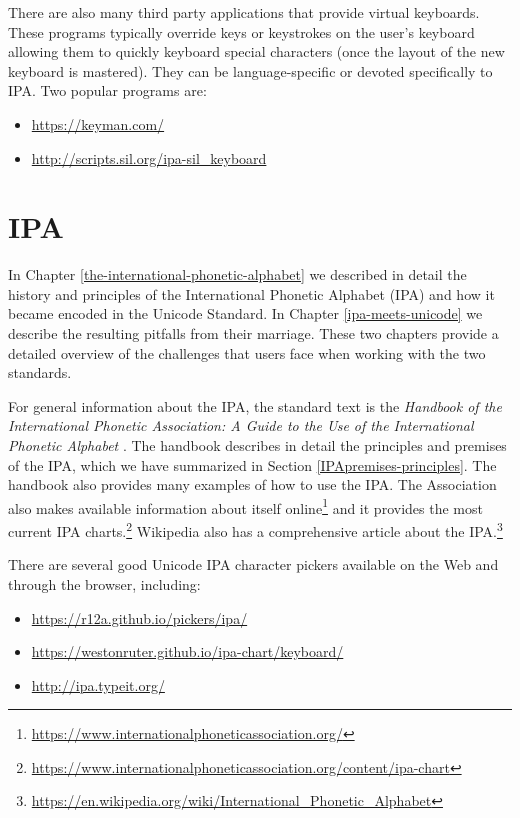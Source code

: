 There are also many third party applications that provide virtual keyboards. These programs typically override keys or keystrokes on the user's keyboard  allowing them to quickly keyboard special characters (once the layout of the new keyboard is mastered). They can be language-specific or devoted specifically to IPA. Two popular programs are:

\begin{itemize}
	\item \url{https://keyman.com/}
	\item \url{http://scripts.sil.org/ipa-sil_keyboard}
\end{itemize}


\section{IPA}
In Chapter \ref{the-international-phonetic-alphabet} we described in detail the history and principles of the International Phonetic Alphabet (IPA) and how it became encoded in the Unicode Standard. In Chapter \ref{ipa-meets-unicode} we describe the resulting pitfalls from their marriage. These two chapters provide a detailed overview of the challenges that users face when working with the two standards.

For general information about the IPA, the standard text is the \textit{Handbook of the International Phonetic Association: A Guide to the Use of the International Phonetic Alphabet} \citep{IPA1999}. The handbook describes in detail the principles and premises of the IPA, which we have summarized in Section \ref{IPApremises-principles}. The handbook also provides many examples of how to use the IPA. The Association also makes available information about itself online\footnote{\url{https://www.internationalphoneticassociation.org/}} and it provides the most current IPA charts.\footnote{\url{https://www.internationalphoneticassociation.org/content/ipa-chart}} Wikipedia also has a comprehensive article about the IPA.\footnote{\url{https://en.wikipedia.org/wiki/International_Phonetic_Alphabet}}

There are several good Unicode IPA character pickers available on the Web and through the browser, including:

\begin{itemize}
	\item \url{https://r12a.github.io/pickers/ipa/}
	\item \url{https://westonruter.github.io/ipa-chart/keyboard/}
	\item \url{http://ipa.typeit.org/}
\end{itemize}

